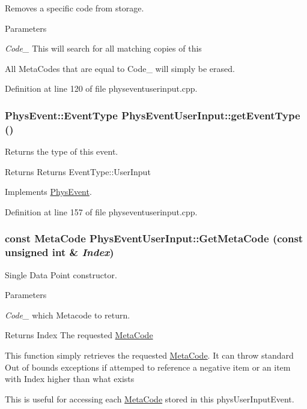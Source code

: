 Removes a specific code from storage. 
\begin{DoxyParams}{Parameters}
\item[{\em Code\_\-}]This will search for all matching copies of this\end{DoxyParams}
All MetaCodes that are equal to Code\_\- will simply be erased. 

Definition at line 120 of file physeventuserinput.cpp.\hypertarget{classPhysEventUserInput_ab89b06b8f7aa148cad453ca9fcae5b89}{
\subsubsection[{getEventType}]{\setlength{\rightskip}{0pt plus 5cm}PhysEvent::EventType PhysEventUserInput::getEventType ()}}
\label{dc/d0e/classPhysEventUserInput_ab89b06b8f7aa148cad453ca9fcae5b89}


Returns the type of this event. \begin{DoxyReturn}{Returns}
Returns EventType::UserInput 
\end{DoxyReturn}


Implements \hyperlink{classPhysEvent}{PhysEvent}.

Definition at line 157 of file physeventuserinput.cpp.\hypertarget{classPhysEventUserInput_aa564530c27f6983bb412e46c2c7ed086}{
\subsubsection[{GetMetaCode}]{\setlength{\rightskip}{0pt plus 5cm}const {\bf MetaCode} PhysEventUserInput::GetMetaCode (const unsigned int \& {\em Index})}}
\label{dc/d0e/classPhysEventUserInput_aa564530c27f6983bb412e46c2c7ed086}


Single Data Point constructor. 
\begin{DoxyParams}{Parameters}
\item[{\em Code\_\-}]which Metacode to return. \end{DoxyParams}
\begin{DoxyReturn}{Returns}
Index The requested \hyperlink{classMetaCode}{MetaCode}
\end{DoxyReturn}
This function simply retrieves the requested \hyperlink{classMetaCode}{MetaCode}. It can throw standard Out of bounds exceptions if attemped to reference a negative item or an item with Index higher than what exists \par
 This is useful for accessing each \hyperlink{classMetaCode}{MetaCode} stored in this physUserInputEvent. 

